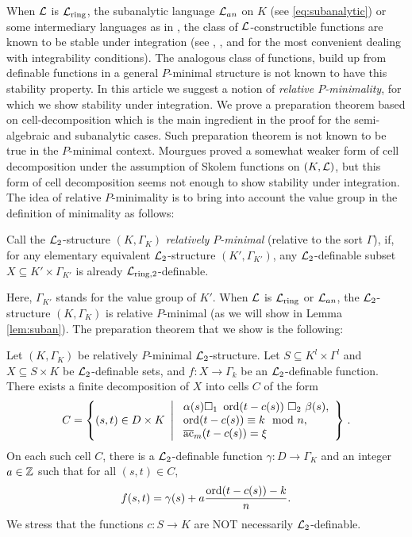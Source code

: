 When ${\mathcal L}$ is ${\mathcal L}_{\rm ring}$, the subanalytic language $\mathcal{L}_{an}$ on $K$ (see \ref{eq:subanalytic}) or some intermediary languages as in \cite{CLip}, the class of $\mathcal{L}$-constructible functions are known to be stable under integration (see \cite{denef-2000}, \cite{Clu-2003}, and \cite{Clu-Gor-Hal-14} for the most convenient dealing with integrability conditions). The analogous class of functions, build up from definable functions in a general $P$-minimal structure is not known to have this stability property. In this article we suggest a notion of \emph{relative $P$-minimality}, for which we show stability under integration. We prove a preparation theorem based on cell-decomposition which is the main ingredient in the proof for the semi-algebraic and subanalytic cases. Such preparation theorem is not known to be true in the $P$-minimal context. Mourgues \cite{mou-09} proved a somewhat weaker form of cell decomposition under the assumption of Skolem functions on $(K,{\mathcal L})$, but this form of cell decomposition seems not enough to show stability under integration. The idea of relative $P$-minimality is to bring into account the value group in the definition of minimality as follows:

\begin{defn}
Call the $\mathcal{L}_2$-structure $(K,\Gamma_K)$ \emph{relatively $P$-minimal} (relative to the sort $\Gamma$), if, for any elementary equivalent $\mathcal{L}_2$-structure $(K',\Gamma_{K'})$, any $\mathcal{L}_2$-definable subset $X\subseteq K'\times \Gamma_{K'}$ is already ${\mathcal L}_{\rm ring, 2}$-definable.
\end{defn}
Here, $\Gamma_{K'}$ stands for the value group of $K'$. When ${\mathcal L}$ is ${\mathcal L}_{\rm ring}$ or $\mathcal{L}_{an}$, the $\mathcal{L}_2$-structure $(K,\Gamma_K)$ is relative $P$-minimal (as we will show in Lemma \ref{lem:suban}). The preparation theorem that we show is the following:  

\begin{thm}\label{thm:partialprep} 
Let $(K,\Gamma_K)$ be relatively $P$-minimal $\mathcal{L}_2$-structure. Let $S\subseteq K^l\times\Gamma^l$ and $X \subseteq S \times K$ be $\mathcal{L}_2$-definable sets, and $f:X\rightarrow \Gamma_k$ be an $\mathcal{L}_2$-definable function. There exists a finite decomposition of $X$ into cells $C$ of the form  
\[C = \left\{(s,t) \in D\times K \ \left| \ \begin{array}{l} \alpha(s) \square_1 \ \ord(t-c(s)) \ \square_2 \ \beta(s),\\ \ord(t-c(s)) \equiv k\mod n,\\ \ac_{m}(t-c(s)) = \xi \end{array} \right\}\right..\]
On each such cell $C$, there is a $\mathcal{L}_2$-definable function $\gamma:D\to\Gamma_K$ and an integer $a\in {\mathbb Z}$ such that for all $(s,t) \in C$, 
\[f(s,t) = \gamma(s) + a\frac{\operatorname{ord}(t-c(s))-k}{n}.\]
We stress that the functions $c: S\to K$ are NOT necessarily $\mathcal{L}_2$-definable.
\end{thm}

